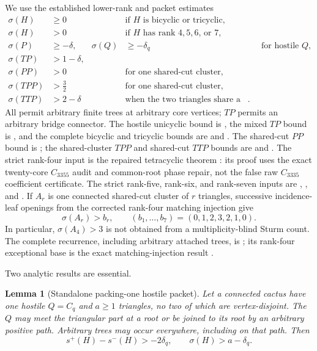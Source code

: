 \documentclass[11pt]{article}
\newtheorem{lemma}[theorem]{Lemma}
\newcommand{\spE}{s^+}
\newcommand{\smE}{s^-}
\newcommand{\sig}{\sigma}
\begin{document}
We use the established lower-rank and packet estimates
\begin{align}
 \sig(H)&\geq0 &&\text{if $H$ is bicyclic or tricyclic},\label{eq:low0}\\
 \sig(H)&>0 &&\text{if $H$ has rank $4,5,6$, or $7$},\label{eq:lowpos}\\
 \sig(P)&\geq-\delta,& \sig(Q)&\geq-\delta_q
   &&\text{for hostile $Q$},\label{eq:hostile}\\
 \sig(TP)&>1-\delta,\label{eq:tp}\\
 \sig(PP)&>0 &&\text{for one shared-cut cluster},\label{eq:pp}\\
 \sig(TPP)&>\frac32 &&\text{for one shared-cut cluster},\label{eq:tpp}\\
 \sig(TTP)&>2-\delta
   &&\text{when the two triangles share a cut}.\label{eq:ttp}
\end{align}
All permit arbitrary finite trees at arbitrary core vertices; $TP$ permits an
arbitrary bridge connector.  The hostile unicyclic bound is
\cite[Lemma~1.1(2)]{Tricyclic}, the mixed $TP$ bound is
\cite[Theorem~3.1]{Bicyclic}, and the complete bicyclic and tricyclic bounds are
\cite[Theorem~5.1]{Bicyclic} and \cite[Theorem~5.1]{Tricyclic}.  The shared-cut
$PP$ bound is \cite[Theorem~4.1]{Bicyclic}; the shared-cluster $TPP$ and
shared-cut $TTP$ bounds are \cite[Proposition~4.2]{Tricyclic} and
\cite[Proposition~3.1]{Tricyclic}.  The strict rank-four input is the repaired
tetracyclic theorem \cite[Theorem~5.1]{Tetracyclic}: its proof
uses the exact twenty-core $C_{3355}$ audit and common-root phase repair, not
the false raw $C_{3335}$ coefficient certificate.  The strict rank-five,
rank-six, and rank-seven inputs are \cite[Theorem~8.1]{Pentacyclic},
\cite[Theorem~9.1]{Hexacyclic}, and \cite[Theorem~9.1]{Heptacyclic}.
If $A_r$ is one connected shared-cut cluster of $r$ triangles, successive
incidence-leaf openings from the corrected rank-four matching injection give
\begin{equation}\label{eq:triangle}
 \sig(A_r)>b_r,
 \qquad (b_1,\ldots,b_7)=(0,1,2,3,2,1,0).
\end{equation}
In particular, $\sig(A_4)>3$ is not obtained from a multiplicity-blind Sturm
count.  The complete recurrence, including arbitrary attached trees, is
\cite[Lemma~3.1]{Heptacyclic}; its rank-four exceptional base is the exact
matching-injection result \cite[Proposition~4.11]{PackingTwo}.

Two analytic results are essential.

\begin{lemma}[Standalone packing-one hostile packet]\label{lem:packing-one}
Let a connected cactus have one hostile $Q=C_q$ and $a\geq1$ triangles, no
two of which are vertex-disjoint.  The $Q$ may meet the triangular part at a
root or be joined to its root by an arbitrary positive path.  Arbitrary trees
may occur everywhere, including on that path.  Then
\[
 \spE(H)-\smE(H)>-2\delta_q,
 \qquad \sig(H)>a-\delta_q.
\]
\end{lemma}
\end{document}
